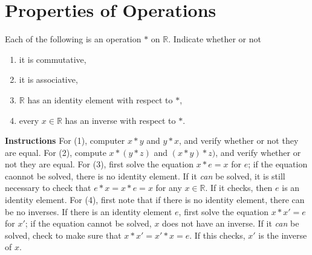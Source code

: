 \documentclass{amsart}
\newcommand{\Reals}{\mathbb{R}{}}
\begin{document}
\section{Properties of Operations}

Each of the following is an operation $*$ on $\Reals$. Indicate whether or
not
\begin{enumerate}
   \item it is commutative,
   \item it is associative,
   \item $\Reals$ has an identity element with respect to $*$,
   \item every $x \in \Reals$ has an inverse with respect to $*$.
\end{enumerate}

\textbf{Instructions} For (1), computer $x * y$ and $y * x$, and verify whether
or not they are equal. For (2), compute $x * (y * z)$ and $(x * y) * z)$, and
verify whether or not they are equal. For (3), first solve the equation
$x * e = x$ for $e$; if the equation caonnot be solved, there is no identity
element. If it \emph{can} be solved, it is still necessary to check that
$e*x=x*e=x$ for any $x\in \Reals$. If it checks, then $e$ is an identity
element. For (4), first note that if there is no identity element, there can
be no inverses. If there is an identity element $e$, first solve the
equation $x*x'=e$ for $x'$; if the equation cannot be solved, $x$ does 
not have an inverse. If it \emph{can} be solved, check to make sure that
$x*x'=x'*x=e$. If this checks, $x'$ is the inverse of $x$.
\end{document}
